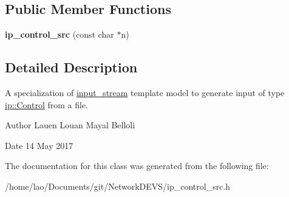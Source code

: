 \subsection*{Public Member Functions}
\begin{DoxyCompactItemize}
\item 
{\bfseries ip\+\_\+control\+\_\+src} (const char $\ast$n)\hypertarget{classip__control__src_a6046f82b5fd050f6ae6f24910f4a2a3c}{}\label{classip__control__src_a6046f82b5fd050f6ae6f24910f4a2a3c}

\end{DoxyCompactItemize}


\subsection{Detailed Description}
A specialization of \hyperlink{classinput__stream}{input\+\_\+stream} template model to generate input of type \hyperlink{structip_1_1Control}{ip\+::\+Control} from a file. 

\begin{DoxyAuthor}{Author}
Lauen Louan Mayal Belloli 
\end{DoxyAuthor}
\begin{DoxyDate}{Date}
14 May 2017 
\end{DoxyDate}


The documentation for this class was generated from the following file\+:\begin{DoxyCompactItemize}
\item 
/home/lao/\+Documents/git/\+Network\+D\+E\+V\+S/ip\+\_\+control\+\_\+src.\+h\end{DoxyCompactItemize}
